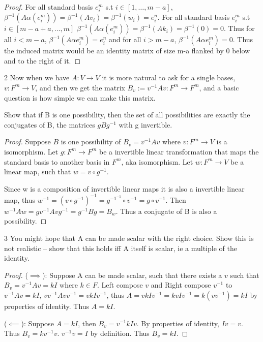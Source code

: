 \documentclass{article}
\newcommand{\rarr}[0]{\rightarrow}
\begin{document}
\begin{proof}
    For all standard basis $e^m_i$ s.t $i \in [1, \ldots, m - a]$, $\beta^{-1}(A \alpha(e^m_i)) = \beta^{-1}(Av_i) = \beta^{-1}(w_i) = e^n_i$. For all standard basis  $e^m_i$ s.t $i \in [m - a + a, \ldots, m]$ $\beta^{-1}(A \alpha(e^m_i)) = \beta^{-1}(A k_i) = \beta^{-1}(0) = 0$. Thus for all $i < m - a$, $\beta^{-1}(A \alpha e^m_i) = e^n_i$ and for all $i > m-a$, $\beta^{-1}(A \alpha e^m_i) = 0$. Thus the induced matrix would be an identity matrix of size m-a flanked by 0 below and to the right of it. 
\end{proof}

\bigskip

\begin{PROB}{2}\label{Problem 2.}
    Now when we have $A: V \to V$ it is more natural to ask for a single bases, $v: F^m \rarr V$, and then we get the matrix $B_v:= v^{-1} A v : F^m \to F^m$, and a basic question is how simple we can make this matrix. 
    
    Show that if B is one possibility, then the set of all possibilities are exactly the conjugates of B, the matrices $gBg^{-1}$ with g invertible. 
\end{PROB}
\begin{proof}
    Suppose $B$ is one possibility of $B_v = v^{-1}Av$ where $v: F^m \rarr V$ is a isomorphism. Let $g: F^m \rarr F^m$ be a invertible linear transformation that maps the standard basis to another basis in $F^m$, aka isomorphism. Let $w: F^m \rarr V$ be a linear map, such that $w = v \circ g^{-1}$. 

    Since w is a composition of invertible linear maps it is also a invertible linear map, thus $w^{-1} = (v \circ g^{-1})^{-1} = g^{-1^{-1}} \circ v^{-1} = g \circ v^{-1}$. Then $w^{-1}Aw = g v^{-1} A vg^{-1} = g^{-1}Bg = B_w$. Thus a conjugate of B is also a possibility.
\end{proof}

\bigskip

\begin{PROB}{3}\label{Problem 3.}
    You might hope that A can be made scalar with the right choice. Show this is not realistic -- show that this holds iff A itself is scalar, ie a multiple of the identity.
\end{PROB}

\begin{proof}
    ($\implies$): Suppose A can be made scalar, such that there exists a $v$ such that $B_v = v^{-1}Av = kI$ where $k \in F$. Left compose $v$ and Right compose $v^{-1}$ to $v^{-1}Av = kI$, $vv^{-1}Avv^{-1} = vkIv^{-1}$, thus $A = vkIv^{-1} = kvIv^{-1} = k(vv^{-1}) = kI$ by properties of identity. Thus $A = kI$.

    ($\impliedby$): Suppose $A = kI$, then $B_v = v^{-1}kIv$. By properties of identity, $Iv = v$. Thus $B_v = kv^{-1}v$. $v^{-1}v = I$ by definition. Thus $B_v = kI$.
\end{proof}
\end{document}
